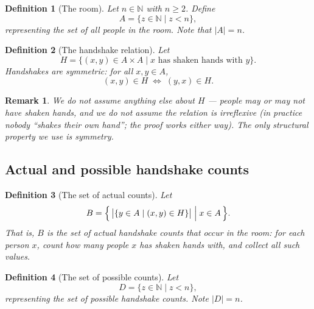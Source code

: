 \documentclass[11pt]{article}
\theoremstyle{defstyle}
\newtheorem{definition}{Definition}[section]
\theoremstyle{thmstyle}
\theoremstyle{notstyle}
\newtheorem*{remark}{Remark}
\theoremstyle{cautionstyle}
\newcommand{\N}{\mathbb{N}}
\newcommand{\hcount}[1]{\bigl|\{y \in A \mid (#1, y) \in H\}\bigr|}
\begin{document}
\begin{defbox}
\begin{definition}[The room]
Let $n \in \N$ with $n \geq 2$. Define
\[
  A = \{z \in \N \mid z < n\},
\]
representing the set of all people in the room. Note that $|A| = n$.
\end{definition}
\end{defbox}

\begin{defbox}
\begin{definition}[The handshake relation]
Let
\[
  H = \{(x,y) \in A \times A \mid x \text{ has shaken hands with } y\}.
\]
Handshakes are symmetric: for all $x, y \in A$,
\[
  (x,y) \in H \;\Longleftrightarrow\; (y,x) \in H.
\]
\end{definition}
\end{defbox}

\begin{notebox}
\begin{remark}
We do not assume anything else about $H$ --- people may or may not have
shaken hands, and we do not assume the relation is irreflexive (in
practice nobody ``shakes their own hand''; the proof works either way).
The only structural property we use is symmetry.
\end{remark}
\end{notebox}

\subsection*{Actual and possible handshake counts}

\begin{defbox}
\begin{definition}[The set of actual counts]
Let
\[
  B = \Bigl\{\, \hcount{x} \;\Big|\; x \in A \,\Bigr\}.
\]
That is, $B$ is the set of \emph{actual} handshake counts that occur in
the room: for each person $x$, count how many people $x$ has shaken
hands with, and collect all such values.
\end{definition}
\end{defbox}

\begin{defbox}
\begin{definition}[The set of possible counts]
Let
\[
  D = \{z \in \N \mid z < n\},
\]
representing the set of \emph{possible} handshake counts. Note
$|D| = n$.
\end{definition}
\end{defbox}
\end{document}
